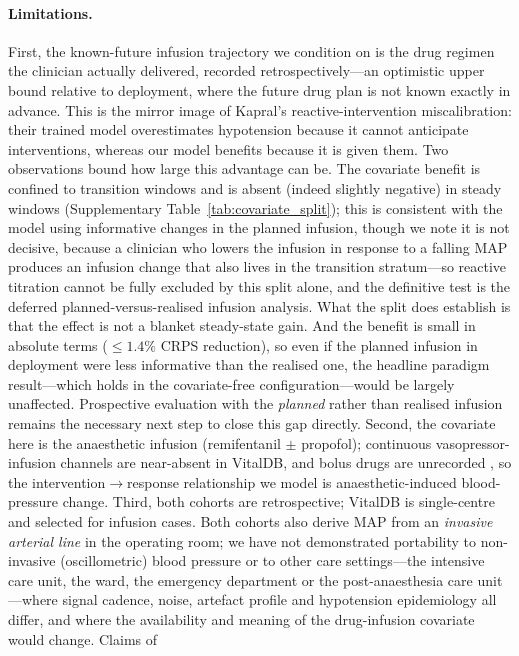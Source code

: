 \documentclass[11pt]{article}
\begin{document}
\paragraph{Limitations.} First, the known-future infusion trajectory we
condition on is the drug regimen the clinician actually delivered, recorded
retrospectively---an optimistic upper bound relative to deployment, where
the future drug plan is not known exactly in advance. This is the mirror
image of Kapral's reactive-intervention miscalibration: their trained model
overestimates hypotension because it cannot anticipate interventions,
whereas our model benefits because it is given them. Two observations bound
how large this advantage can be. The covariate benefit is confined to
transition windows and is absent (indeed slightly negative) in steady
windows (Supplementary Table~\ref{tab:covariate_split}); this is consistent
with the model using informative changes in the planned infusion, though we
note it is not decisive, because a clinician who lowers the infusion in
response to a falling MAP produces an infusion change that also lives in the
transition stratum---so reactive titration cannot be fully excluded by this
split alone, and the definitive test is the deferred planned-versus-realised
infusion analysis. What the split does establish is that the effect is not a
blanket steady-state gain. And the benefit is small in absolute terms
($\leq1.4\%$ CRPS reduction), so even if the planned infusion in deployment
were less informative than the realised one, the headline paradigm
result---which holds in the covariate-free configuration---would be largely
unaffected. Prospective evaluation with the \emph{planned} rather
than realised infusion remains the necessary next step to close this gap
directly. Second, the covariate here is the anaesthetic infusion (remifentanil
$\pm$ propofol); continuous vasopressor-infusion channels are near-absent in
VitalDB, and bolus drugs are unrecorded \citep{Kapral2024}, so the
intervention$\rightarrow$response relationship we model is anaesthetic-induced
blood-pressure change. Third, both cohorts are retrospective; VitalDB is
single-centre and selected for infusion cases. Both cohorts also derive MAP
from an \emph{invasive arterial line} in the operating room; we have not
demonstrated portability to non-invasive (oscillometric) blood pressure or to
other care settings---the intensive care unit, the ward, the emergency
department or the post-anaesthesia care unit---where signal cadence, noise,
artefact profile and hypotension epidemiology all differ, and where the
availability and meaning of the drug-infusion covariate would change. Claims of
\end{document}
